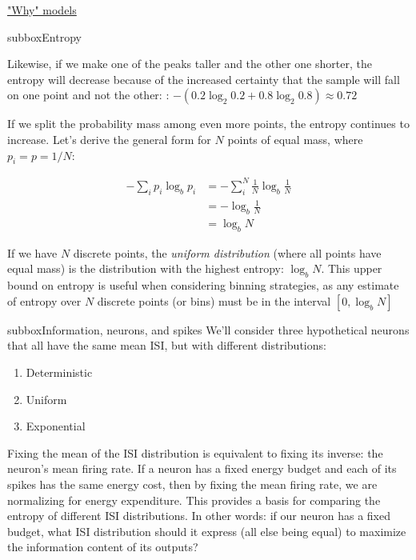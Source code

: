 \begin{textbox}{\href{https://compneuro.neuromatch.io/tutorials/W1D1_ModelTypes/student/W1D1_Tutorial3.html}{"Why" models } }


\begin{subbox}{subbox}{Entropy}
\scriptsize


Likewise, if we make one of the peaks taller and the other one shorter, the entropy will decrease because of the increased certainty that the sample will fall on one point and not the other: : $-(0.2 \log_2 0.2 + 0.8\log_2 0.8)\approx 0.72$

If we split the probability mass among even more points, the entropy continues to increase. Let's derive the general form for $N$ points of equal mass, where $p_i=p=1/N$:

\begin{align}
-\sum_i p_i \log_b p_i &= -\sum_i^N \frac{1}{N} \log_b \frac{1}{N} \\
&= -\log_b \frac{1}{N} \\
&= \log_b N
\end{align}

If we have $N$ discrete points, the \textit{uniform distribution} (where all points have equal mass) is the distribution with the highest entropy: $\log_b N$. This upper bound on entropy is useful when considering binning strategies, as any estimate of entropy over $N$ discrete points (or bins) must be in the interval $[0, \log_b N]$

\end{subbox}

\begin{subbox}{subbox}{Information, neurons, and spikes}
\scriptsize
We'll consider three hypothetical neurons that all have the same mean ISI, but with different distributions:
\begin{enumerate}
\item Deterministic
\item Uniform
\item Exponential
\end{enumerate}
Fixing the mean of the ISI distribution is equivalent to fixing its inverse: the neuron's mean firing rate. If a neuron has a fixed energy budget and each of its spikes has the same energy cost, then by fixing the mean firing rate, we are normalizing for energy expenditure. This provides a basis for comparing the entropy of different ISI distributions. In other words: if our neuron has a fixed budget, what ISI distribution should it express (all else being equal) to maximize the information content of its outputs?


\end{subbox}
\end{textbox}
